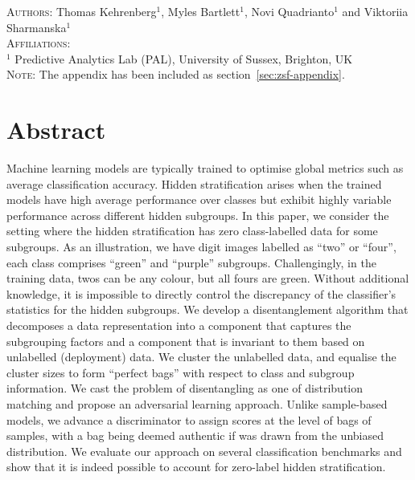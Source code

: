 
\textsc{Authors}:
Thomas Kehrenberg$^1$, Myles Bartlett$^1$, Novi Quadrianto$^1$ and Vik\-to\-riia Shar\-man\-s\-ka$^1$ \\
\textsc{Affiliations}:\\
$^1$ Predictive Analytics Lab (PAL), University of Sussex, Brighton, UK\\
\textsc{Note}:\;\; The appendix has been included as section~\ref{sec:zsf-appendix}.

\section{Abstract}
Machine learning models are typically trained to optimise global metrics such as average classification accuracy. 
%
Hidden stratification arises when the trained models have high average performance over classes but exhibit highly variable performance across different hidden subgroups.
%
In this paper, we consider the setting where the hidden stratification has zero class-labelled data for some subgroups. 
As an illustration, we have digit images labelled as ``two'' or ``four'', each class comprises ``green'' and ``purple'' subgroups.
%
Challengingly, in the training data, twos can be any colour, but all fours are green. 
%
Without additional knowledge, it is impossible to directly control the discrepancy of the classifier’s statistics for the hidden subgroups. 
%
We develop a disentanglement algorithm that decomposes a data representation into a component that captures the subgrouping factors and a component that is invariant to them based on unlabelled (deployment) data. 
%
We cluster the unlabelled data, and equalise the cluster sizes to form ``perfect bags'' with respect to class and subgroup information.
%
We cast the problem of disentangling as one of distribution matching and propose an adversarial learning approach.
%
%
Unlike sample-based models, we advance a discriminator to assign scores at the level of bags of samples, with a bag being deemed authentic if was drawn from the unbiased distribution. 
%
We evaluate our approach on several classification benchmarks and show that it is indeed possible to account for zero-label hidden stratification.

